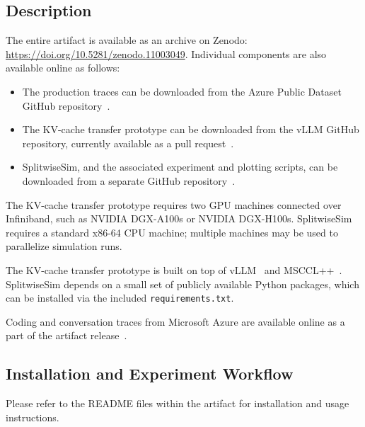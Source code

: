 \subsection{Description}

The entire artifact is available as an archive on Zenodo: \url{https://doi.org/10.5281/zenodo.11003049}.
Individual components are also available online as follows:
\begin{itemize}
    \item The production traces can be downloaded from the Azure Public Dataset GitHub repository~\cite{azure_llm_trace}. 
    \item The KV-cache transfer prototype can be downloaded from the vLLM GitHub repository, currently available as a pull request~\cite{splitwise_vllm_pr}.
    \item SplitwiseSim, and the associated experiment and plotting scripts, can be downloaded from a separate GitHub repository~\cite{splitwise_sim}.
\end{itemize}

The KV-cache transfer prototype requires two GPU machines connected over Infiniband, such as NVIDIA DGX-A100s or NVIDIA DGX-H100s. SplitwiseSim requires a standard x86-64 CPU machine; multiple machines may be used to parallelize simulation runs.

The KV-cache transfer prototype is built on top of vLLM~\cite{vllm} and MSCCL++~\cite{mscclpp}.
SplitwiseSim depends on a small set of publicly available Python packages, which can be installed via the included \texttt{requirements.txt}.

Coding and conversation traces from Microsoft Azure are available online as a part of the artifact release~\cite{azure_llm_trace}.



\subsection{Installation and Experiment Workflow}

Please refer to the README files within the artifact for installation and usage instructions.

